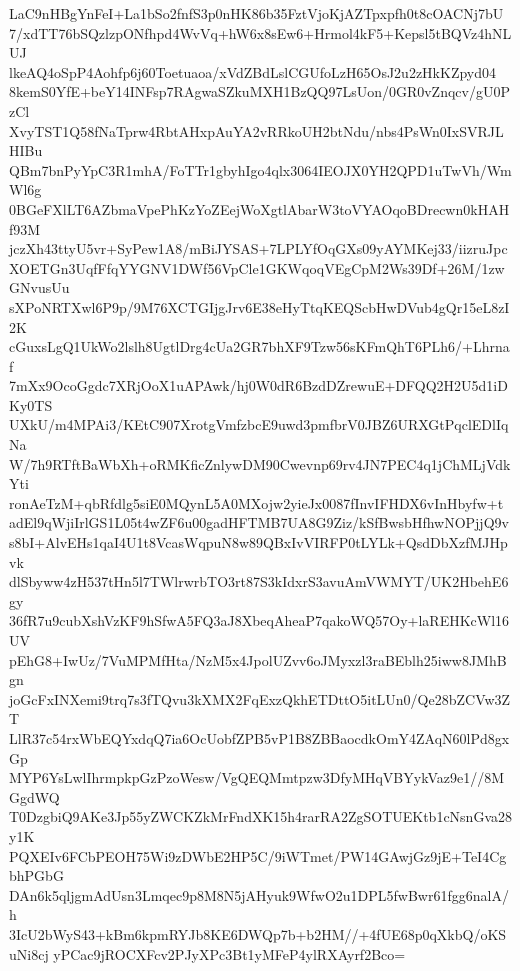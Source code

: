 LaC9nHBgYnFeI+La1bSo2fnfS3p0nHK86b35FztVjoKjAZTpxpfh0t8cOACNj7bU
7/xdTT76bSQzlzpONfhpd4WvVq+hW6x8sEw6+Hrmol4kF5+Kepsl5tBQVz4hNLUJ
lkeAQ4oSpP4Aohfp6j60Toetuaoa/xVdZBdLslCGUfoLzH65OsJ2u2zHkKZpyd04
8kemS0YfE+beY14INFsp7RAgwaSZkuMXH1BzQQ97LsUon/0GR0vZnqcv/gU0PzCl
XvyTST1Q58fNaTprw4RbtAHxpAuYA2vRRkoUH2btNdu/nbs4PsWn0IxSVRJLHIBu
QBm7bnPyYpC3R1mhA/FoTTr1gbyhIgo4qlx3064IEOJX0YH2QPD1uTwVh/WmWl6g
0BGeFXlLT6AZbmaVpePhKzYoZEejWoXgtlAbarW3toVYAOqoBDrecwn0kHAHf93M
jczXh43ttyU5vr+SyPew1A8/mBiJYSAS+7LPLYfOqGXs09yAYMKej33/iizruJpc
XOETGn3UqfFfqYYGNV1DWf56VpCle1GKWqoqVEgCpM2Ws39Df+26M/1zwGNvusUu
sXPoNRTXwl6P9p/9M76XCTGIjgJrv6E38eHyTtqKEQScbHwDVub4gQr15eL8zI2K
cGuxsLgQ1UkWo2lslh8UgtlDrg4cUa2GR7bhXF9Tzw56sKFmQhT6PLh6/+Lhrnaf
7mXx9OcoGgdc7XRjOoX1uAPAwk/hj0W0dR6BzdDZrewuE+DFQQ2H2U5d1iDKy0TS
UXkU/m4MPAi3/KEtC907XrotgVmfzbcE9uwd3pmfbrV0JBZ6URXGtPqclEDlIqNa
W/7h9RTftBaWbXh+oRMKficZnlywDM90Cwevnp69rv4JN7PEC4q1jChMLjVdkYti
ronAeTzM+qbRfdlg5siE0MQynL5A0MXojw2yieJx0087fInvIFHDX6vInHbyfw+t
adEl9qWjiIrlGS1L05t4wZF6u00gadHFTMB7UA8G9Ziz/kSfBwsbHfhwNOPjjQ9v
s8bI+AlvEHs1qaI4U1t8VcasWqpuN8w89QBxIvVIRFP0tLYLk+QsdDbXzfMJHpvk
dlSbyww4zH537tHn5l7TWlrwrbTO3rt87S3kIdxrS3avuAmVWMYT/UK2HbehE6gy
36fR7u9cubXshVzKF9hSfwA5FQ3aJ8XbeqAheaP7qakoWQ57Oy+laREHKcWl16UV
pEhG8+IwUz/7VuMPMfHta/NzM5x4JpolUZvv6oJMyxzl3raBEblh25iww8JMhBgn
joGcFxINXemi9trq7s3fTQvu3kXMX2FqExzQkhETDttO5itLUn0/Qe28bZCVw3ZT
LlR37c54rxWbEQYxdqQ7ia6OcUobfZPB5vP1B8ZBBaocdkOmY4ZAqN60lPd8gxGp
MYP6YsLwlIhrmpkpGzPzoWesw/VgQEQMmtpzw3DfyMHqVBYykVaz9e1//8MGgdWQ
T0DzgbiQ9AKe3Jp55yZWCKZkMrFndXK15h4rarRA2ZgSOTUEKtb1cNsnGva28y1K
PQXEIv6FCbPEOH75Wi9zDWbE2HP5C/9iWTmet/PW14GAwjGz9jE+TeI4CgbhPGbG
DAn6k5qljgmAdUsn3Lmqec9p8M8N5jAHyuk9WfwO2u1DPL5fwBwr61fgg6nalA/h
3IcU2bWyS43+kBm6kpmRYJb8KE6DWQp7b+b2HM//+4fUE68p0qXkbQ/oKSuNi8cj
yPCac9jROCXFcv2PJyXPc3Bt1yMFeP4ylRXAyrf2Bco=
